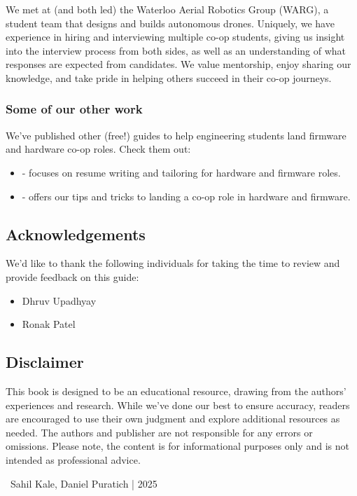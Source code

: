 \documentclass[main.tex]{subfiles}
\begin{document}
\newnoindentpara We met at (and both led) the Waterloo Aerial Robotics Group (WARG), a student team that designs and builds autonomous drones. Uniquely, we have experience in hiring and interviewing multiple co-op students, giving us insight into the interview process from both sides, as well as an understanding of what responses are expected from candidates. We value mentorship, enjoy sharing our knowledge, and take pride in helping others succeed in their co-op journeys.

\subsubsection{Some of our other work}
We've published other (free!) guides to help engineering students land firmware and hardware co-op roles. Check them out:
\begin{itemize}
    \item {} - focuses on resume writing and tailoring for hardware and firmware roles.
    \item {} - offers our tips and tricks to landing a co-op role in hardware and firmware.
\end{itemize}

\subsection{Acknowledgements}
We'd like to thank the following individuals for taking the time to review and provide feedback on this guide:
\begin{itemize}
    \item Dhruv Upadhyay
    \item Ronak Patel
\end{itemize}

\subsection{Disclaimer}
This book is designed to be an educational resource, drawing from the authors' experiences and research. While we've done our best to ensure accuracy, readers are encouraged to use their own judgment and explore additional resources as needed. The authors and publisher are not responsible for any errors or omissions. Please note, the content is for informational purposes only and is not intended as professional advice. \newline

\newnoindentpara \textcopyright \ Sahil Kale, Daniel Puratich | 2025
\end{document}
